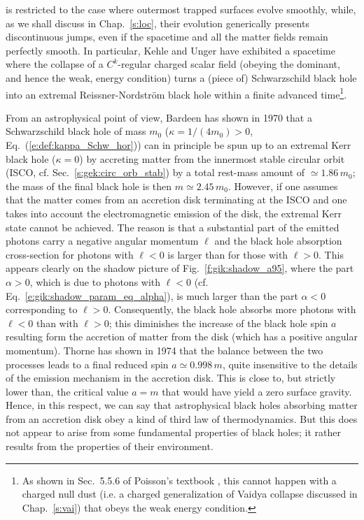is restricted to the case where outermost trapped surfaces evolve smoothly, while, as we shall discuss in Chap.~\ref{s:loc},
their evolution generically presents discontinuous jumps, even if the spacetime
and all the matter fields remain perfectly smooth. In particular, Kehle and Unger \cite{KehleU23} have exhibited
a spacetime where the collapse of a $C^k$-regular charged scalar field (obeying the dominant, and hence the weak, energy condition) turns a (piece of) Schwarzschild black hole
into an extremal Reissner-Nordström black hole within a finite advanced time\footnote{As shown
in Sec.~5.5.6 of Poisson's textbook \cite{Poiss04}, this cannot happen with a charged null dust
(i.e. a charged generalization of Vaidya collapse discussed in Chap.~\ref{s:vai}) that obeys
the weak energy condition.}.

From an astrophysical point of view, Bardeen has shown in 1970 \cite{Barde70a}
that a Schwarzschild black hole
of mass $m_0$ ($\kappa = 1/(4m_0) > 0$, Eq.~(\ref{e:def:kappa_Schw_hor}))
can in principle be spun up to an extremal Kerr black hole
($\kappa = 0$)
by accreting matter from the
innermost stable circular orbit
(ISCO, cf. Sec.~\ref{s:gek:circ_orb_stab}) by a total rest-mass amount of
$\simeq 1.86\, m_0$; the mass of the final black hole is then $m \simeq 2.45\, m_0$.
However, if one assumes that the matter comes from an accretion disk
terminating at the ISCO and
one takes into account the electromagnetic emission of the disk, the extremal Kerr state
cannot be achieved. The reason is that a substantial part of the emitted photons carry a negative angular momentum $\ell$ and
the black hole absorption cross-section for photons with $\ell<0$ is larger than for those with
$\ell>0$. This appears clearly on the shadow picture of Fig.~\ref{f:gik:shadow_a95},
where the part $\alpha>0$, which is due to photons
with $\ell < 0$ (cf. Eq.~\ref{e:gik:shadow_param_eq_alpha}), is much larger than the part $\alpha<0$
corresponding to $\ell > 0$. Consequently, the black hole absorbs more photons with $\ell < 0$
than with $\ell>0$; this diminishes the increase of the black hole spin $a$ resulting form the accretion of  matter from the disk (which has a positive angular momentum). Thorne has shown in 1974 \cite{Thorn74} that the balance between the two processes leads to a final reduced spin $a \simeq 0.998 \, m$, quite insensitive to the details
of the emission mechanism in the accretion disk. This is close to, but strictly lower than, the critical
value $a = m$ that would have yield a zero surface gravity. Hence, in this respect, we can say that
astrophysical black holes absorbing matter from an accretion disk obey a kind of third law of thermodynamics.
But this does not appear to arise from some fundamental properties of black holes; it rather results from the properties of their environment.

